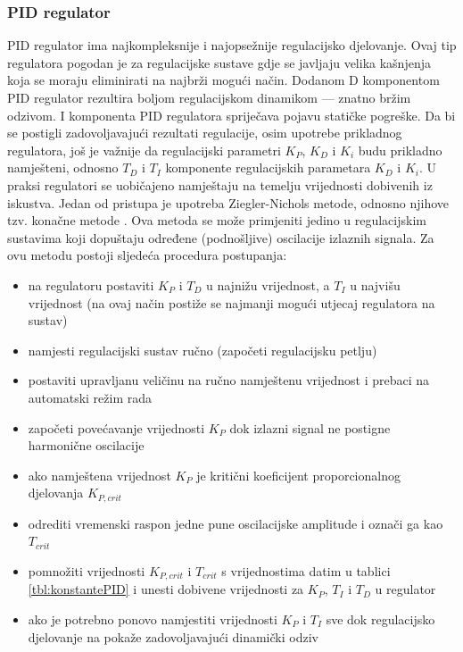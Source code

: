 \documentclass[times, utf8, diplomski]{fer}
\begin{document}
\subsubsection{PID regulator}\label{PIDreg}
PID regulator ima najkompleksnije i najopsežnije regulacijsko djelovanje. Ovaj tip regulatora pogodan je za regulacijske sustave gdje se javljaju velika kašnjenja koja se moraju eliminirati na najbrži mogući način. Dodanom D komponentom PID regulator rezultira boljom regulacijskom dinamikom --- znatno bržim odzivom. I komponenta PID regulatora spriječava pojavu statičke pogreške. 
Da bi se postigli zadovoljavajući rezultati regulacije, osim upotrebe  prikladnog regulatora, još je važnije da regulacijski parametri $K_P$, $K_D$ i $K_i$ budu prikladno namješteni, odnosno $T_D$ i $T_I$ komponente regulacijskih parametara $K_D$ i $K_i$.
U praksi regulatori se uobičajeno namještaju na temelju vrijednosti dobivenih iz iskustva.
Jedan od pristupa je upotreba Ziegler-Nichols metode, odnosno njihove tzv. konačne metode .
Ova metoda se može primjeniti jedino u regulacijskim sustavima koji dopuštaju određene (podnošljive) oscilacije izlaznih signala.
Za ovu metodu postoji sljedeća procedura postupanja:
\begin{itemize}
\item na regulatoru postaviti $K_P$ i $T_D$ u najnižu vrijednost, a $T_I$ u najvišu vrijednost (na ovaj način postiže se najmanji mogući utjecaj regulatora na sustav)
\item namjesti regulacijski sustav ručno (započeti regulacijsku petlju)
\item postaviti upravljanu veličinu na ručno namještenu vrijednost i prebaci na automatski režim rada
\item započeti povećavanje vrijednosti $K_P$ dok izlazni signal ne postigne harmonične 
oscilacije
\item ako namještena vrijednost $K_P$ je kritični koeficijent proporcionalnog djelovanja $K_{P,crit}$
\item odrediti vremenski raspon jedne pune oscilacijske amplitude i označi ga kao $T_{crit}$
\item pomnožiti vrijednosti $K_{P,crit}$ i $T_{crit}$ s vrijednostima datim u tablici \ref{tbl:konstantePID} i unesti dobivene vrijednosti za $K_P$, $T_I$ i $T_D$ u regulator
\item ako je potrebno ponovo namjestiti vrijednosti $K_P$ i $T_I$ sve dok regulacijsko djelovanje na pokaže zadovoljavajući dinamički odziv
\end{itemize}
\end{document}
